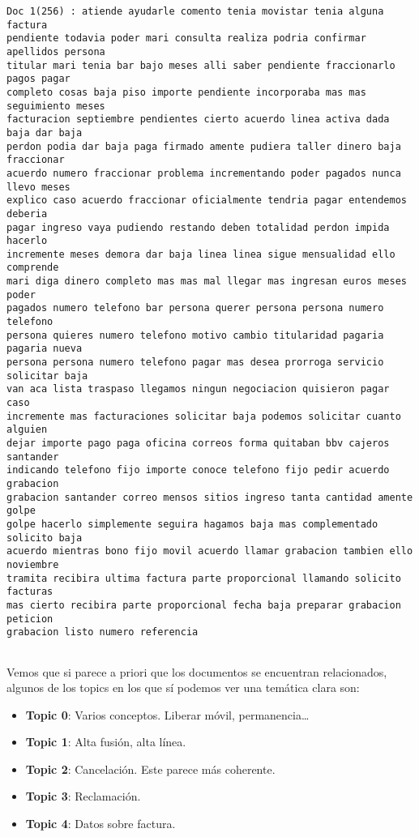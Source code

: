 \begin{Verbatim}[commandchars=\\\{\}]
Doc 1(256) : atiende ayudarle comento tenia movistar tenia alguna factura
pendiente todavia poder mari consulta realiza podria confirmar apellidos persona
titular mari tenia bar bajo meses alli saber pendiente fraccionarlo pagos pagar
completo cosas baja piso importe pendiente incorporaba mas mas seguimiento meses
facturacion septiembre pendientes cierto acuerdo linea activa dada baja dar baja
perdon podia dar baja paga firmado amente pudiera taller dinero baja fraccionar
acuerdo numero fraccionar problema incrementando poder pagados nunca llevo meses
explico caso acuerdo fraccionar oficialmente tendria pagar entendemos deberia
pagar ingreso vaya pudiendo restando deben totalidad perdon impida hacerlo
incremente meses demora dar baja linea linea sigue mensualidad ello comprende
mari diga dinero completo mas mas mal llegar mas ingresan euros meses poder
pagados numero telefono bar persona querer persona persona numero telefono
persona quieres numero telefono motivo cambio titularidad pagaria pagaria nueva
persona persona numero telefono pagar mas desea prorroga servicio solicitar baja
van aca lista traspaso llegamos ningun negociacion quisieron pagar caso
incremente mas facturaciones solicitar baja podemos solicitar cuanto alguien
dejar importe pago paga oficina correos forma quitaban bbv cajeros santander
indicando telefono fijo importe conoce telefono fijo pedir acuerdo grabacion
grabacion santander correo mensos sitios ingreso tanta cantidad amente golpe
golpe hacerlo simplemente seguira hagamos baja mas complementado solicito baja
acuerdo mientras bono fijo movil acuerdo llamar grabacion tambien ello noviembre
tramita recibira ultima factura parte proporcional llamando solicito facturas
mas cierto recibira parte proporcional fecha baja preparar grabacion peticion
grabacion listo numero referencia


    \end{Verbatim}

    Vemos que si parece a priori que los documentos se encuentran
relacionados, algunos de los topics en los que sí podemos ver una
temática clara son:


\begin{itemize}
\item \textbf{Topic 0}: Varios conceptos. Liberar móvil, permanencia\ldots{}

\item \textbf{Topic 1}: Alta fusión, alta línea.

\item \textbf{Topic 2}: Cancelación. Este parece más coherente.

\item \textbf{Topic 3}: Reclamación.

\item \textbf{Topic 4}: Datos sobre factura.

\end{itemize}
